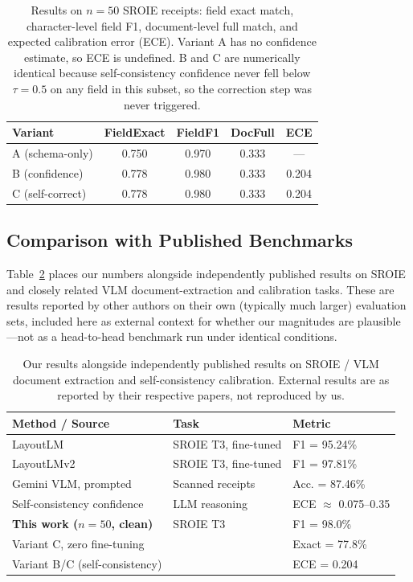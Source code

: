 \documentclass[conference]{IEEEtran}
\begin{document}
\begin{table}[htb]
\centering
\caption{Results on \(n=50\) SROIE receipts: field exact match, character-level field F1, document-level full match, and expected calibration error (ECE). Variant A has no confidence estimate, so ECE is undefined. B and C are numerically identical because self-consistency confidence never fell below \(\tau=0.5\) on any field in this subset, so the correction step was never triggered.}
\label{tab:results}
\begin{tabular}{lcccc}
\hline
\textbf{Variant} & \textbf{FieldExact} & \textbf{FieldF1} & \textbf{DocFull} & \textbf{ECE}\\
\hline
A (schema-only) & 0.750 & 0.970 & 0.333 & ---\\
B (confidence) & 0.778 & 0.980 & 0.333 & 0.204\\
C (self-correct) & 0.778 & 0.980 & 0.333 & 0.204\\
\hline
\end{tabular}
\end{table}

\subsection{Comparison with Published Benchmarks}
\label{sec:litcompare}
Table~\ref{tab:litcompare} places our numbers alongside independently published results on SROIE and closely related VLM document-extraction and calibration tasks. These are results reported by other authors on their own (typically much larger) evaluation sets, included here as external context for whether our magnitudes are plausible---not as a head-to-head benchmark run under identical conditions.

\begin{table}[htb]
\centering
\caption{Our results alongside independently published results on SROIE / VLM document extraction and self-consistency calibration. External results are as reported by their respective papers, not reproduced by us.}
\label{tab:litcompare}
\begin{tabular}{p{2.9cm}p{1.7cm}p{2.1cm}}
\hline
\textbf{Method / Source} & \textbf{Task} & \textbf{Metric}\\
\hline
LayoutLM \cite{b8} & SROIE T3, fine-tuned & F1 = 95.24\%\\
LayoutLMv2 \cite{b9} & SROIE T3, fine-tuned & F1 = 97.81\%\\
Gemini VLM, prompted \cite{b10} & Scanned receipts & Acc. = 87.46\%\\
Self-consistency confidence \cite{b11} & LLM reasoning & ECE $\approx$ 0.075--0.35\\
\hline
\textbf{This work (\(n{=}50\), clean)} & SROIE T3 & F1 = 98.0\%\\
Variant C, zero fine-tuning & & Exact = 77.8\%\\
Variant B/C (self-consistency) & & ECE = 0.204\\
\hline
\end{tabular}
\end{table}
\end{document}
